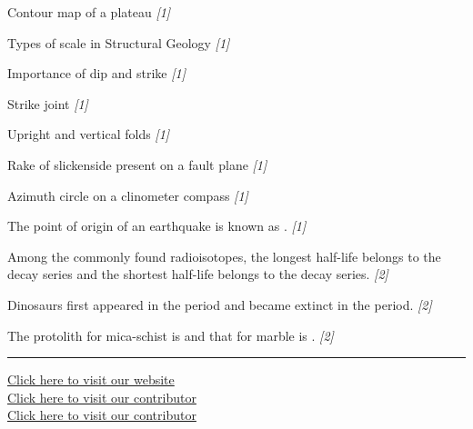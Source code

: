 \documentclass[11pt,a4paper]{article}
\newcommand{\pts}[1]{\hfill   \textit{[#1]}}
\begin{document}
\begin{parts}
  \item Contour map of a plateau \pts{1}
  \item Types of scale in Structural Geology \pts{1}
  \item Importance of dip and strike \pts{1}
  \item Strike joint \pts{1}
  \item Upright and vertical folds \pts{1}
  \item Rake of slickenside present on a fault plane \pts{1}
  \item Azimuth circle on a clinometer compass \pts{1}
  \item The point of origin of an earthquake is known as \underline{\hspace{3cm}}. \pts{1}
  \item Among the commonly found radioisotopes, the longest half-life belongs to the \underline{\hspace{3cm}} decay series and the shortest half-life belongs to the \underline{\hspace{3cm}} decay series. \pts{2}
  \item Dinosaurs first appeared in the \underline{\hspace{3cm}} period and became extinct in the \underline{\hspace{3cm}} period. \pts{2}
  \item The protolith for mica-schist is \underline{\hspace{3cm}} and that for marble is \underline{\hspace{3cm}}. \pts{2}
\end{parts}

\vfill\rule{\linewidth}{0.4pt}

\begin{center}\small
\href{https://bhu-exam.vercel.app/}{Click here to visit our website}\\[4pt]
\href{https://me-aryan.vercel.app/}{Click here to visit our contributor}\\[4pt]
\href{https://quashan-me.vercel.app/}{Click here to visit our contributor}
\end{center}
\end{document}
